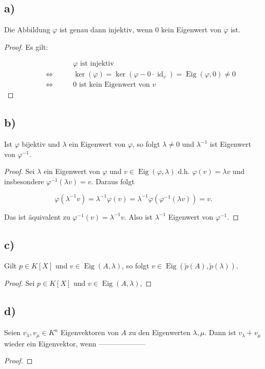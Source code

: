\documentclass{article}
\DeclareMathOperator{\id}{id}
\DeclareMathOperator{\Kern}{ker}
\DeclareMathOperator{\eigenraum}{Eig}
\begin{document}
\subsection*{a)}

Die Abbildung $\varphi$ ist genau dann injektiv,
wenn $0$ kein Eigenwert von $\varphi$ ist.

\begin{proof}
Es gilt:

\[
\begin{aligned}
  &\text{$\varphi$ ist injektiv}\\
  \qquad\Leftrightarrow\qquad
  &\Kern(\varphi) = \Kern(\varphi - 0 \cdot \id_v) = \eigenraum(\varphi, 0) \neq 0 \\
  \qquad\Leftrightarrow\qquad
  &\text{$0$ ist kein Eigenwert von $v$}
\end{aligned}
\]
\end{proof}

\subsection*{b)}

Ist $\varphi$ bijektiv und $\lambda$ ein Eigenwert von $\varphi$,
so folgt
$\lambda \neq 0$
und $\lambda^{-1}$ ist Eigenwert von $\varphi^{-1}$.

\begin{proof}
  Sei $\lambda$ ein Eigenwert von $\varphi$
  und $v \in \eigenraum(\varphi, \lambda)$ d.h.
  $\varphi(v) = \lambda v$ und insbesondere $\varphi^{-1}(\lambda v) = v$.
  Daraus folgt

  \[
  \varphi(\lambda^{-1} v)
  = \lambda^{-1} \varphi(v)
  = \lambda^{-1} \varphi(\varphi^{-1}(\lambda v))
  = v.
  \]

  Das ist äquivalent zu $\varphi^{-1}(v) = \lambda^{-1} v$.
  Also ist $\lambda^{-1}$ Eigenwert von $\varphi^{-1}$.
\end{proof}

\subsection*{c)}

Gilt
$p \in K[X]$
und
$v \in \eigenraum(A, \lambda)$,
so folgt
$v \in \eigenraum(\tilde{p}(A), \tilde{p}(\lambda))$.

\begin{proof}
  Sei $p \in K[X]$
  und
  $v \in \eigenraum(A, \lambda)$,

\end{proof}

\subsection*{d)}

Seien
$v_{\lambda}, v_{\mu} \in K^n$
Eigenvektoren von $A$ zu den Eigenwerten
$\lambda, \mu$.
Dann ist
$v_{\lambda} + v_{\mu}$
wieder ein Eigenvektor,
wenn --------------------

\begin{proof}

\end{proof}
\end{document}
